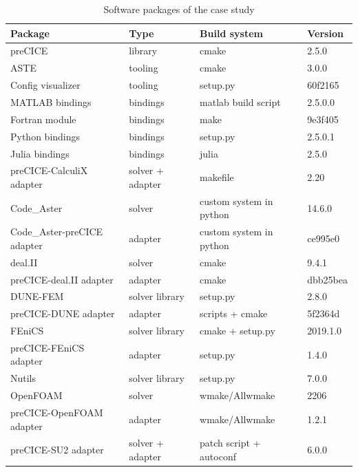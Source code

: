 \documentclass{eceasst}
\begin{document}
\begin{table}[!t]
  \normalsize
  \caption{Software packages of the case study}
  \label{table:label-distribution}
  \centering
  \begin{tabular}{|l|l|l|l|}
    \hline
    \bfseries Package & \bfseries Type & \bfseries Build system & \bfseries Version \\ \hline
    preCICE & library & cmake & 2.5.0 \\ \hline
    ASTE & tooling & cmake & 3.0.0 \\ \hline
    Config visualizer & tooling & setup.py & 60f2165 \\ \hline
    MATLAB bindings & bindings & matlab build script & 2.5.0.0 \\ \hline
    Fortran module & bindings & make & 9e3f405 \\ \hline
    Python bindings & bindings & setup.py & 2.5.0.1 \\ \hline
    Julia bindings & bindings & julia & 2.5.0 \\ \hline
    preCICE-CalculiX adapter & solver + adapter & makefile & 2.20 \\ \hline
    Code\_Aster & solver & custom system in python & 14.6.0 \\ \hline
    Code\_Aster-preCICE adapter & adapter & custom system in python & ce995e0 \\ \hline
    deal.II & solver & cmake & 9.4.1 \\ \hline
    preCICE-deal.II adapter & adapter & cmake & dbb25bea \\ \hline
    DUNE-FEM & solver library & setup.py & 2.8.0 \\ \hline
    preCICE-DUNE adapter& adapter & scripts + cmake & 5f2364d \\ \hline
    FEniCS & solver library& cmake + setup.py & 2019.1.0 \\ \hline
    preCICE-FEniCS adapter & adapter & setup.py & 1.4.0 \\ \hline
    Nutils & solver library & setup.py & 7.0.0 \\ \hline
    OpenFOAM & solver & wmake/Allwmake & 2206 \\ \hline
    preCICE-OpenFOAM adapter & adapter & wmake/Allwmake & 1.2.1 \\ \hline
    preCICE-SU2 adapter & solver + adapter & patch script + autoconf & 6.0.0 \\ \hline
  \end{tabular}
\end{table}
\end{document}
